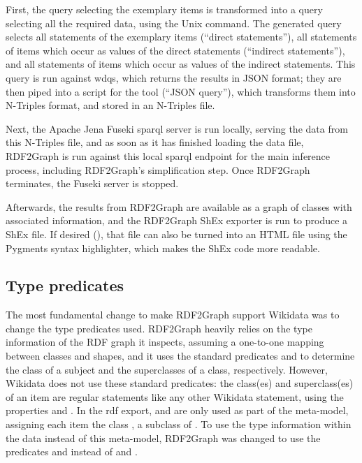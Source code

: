 First, the query selecting the exemplary items is transformed
into a query selecting all the required data,
using the Unix  command.
The generated query selects all statements of the exemplary items (“direct statements”),
all statements of items which occur as values of the direct statements (“indirect statements”),
and all  statements of items which occur as values of the indirect statements.
This query is run against \gls{wdqs},
which returns the results in JSON format; %
they are then piped into a script for the  tool (“JSON query”),
which transforms them into N-Triples format, %
and stored in an N-Triples file.

Next, the Apache Jena Fuseki \gls{sparql} server is run locally,
serving the data from this N-Triples file,
and as soon as it has finished loading the data file,
RDF2Graph is run against this local \gls{sparql} endpoint for the main inference process,
including RDF2Graph’s simplification step.
Once RDF2Graph terminates, the Fuseki server is stopped.

Afterwards, the results from RDF2Graph are available as a graph of classes with associated information,
and the RDF2Graph ShEx exporter is run to produce a ShEx file.
If desired (),
that file can also be turned into an HTML file using the Pygments syntax highlighter,
which makes the ShEx code more readable.


\subsection{Type predicates}
\label{subsec:RDF2Graph+Wikidata:Wikidata:predicates}

The most fundamental change to make RDF2Graph support Wikidata
was %
to change the type predicates used.
RDF2Graph heavily relies on the type information of the RDF graph it inspects,
assuming a one-to-one mapping between classes and shapes,
and it uses the standard predicates  and 
to determine the class of a subject and the superclasses of a class, respectively.
However, Wikidata does not use these standard predicates:
the class(es) and superclass(es) of an item
are regular statements like any other Wikidata statement,
using the properties  and .
In the \gls{rdf} export,  and  are only used
as part of the meta-model, %
assigning each item the class , a subclass of .
To use the type information within the data instead of this meta-model,
RDF2Graph was changed to use the predicates  and 
instead of  and .

